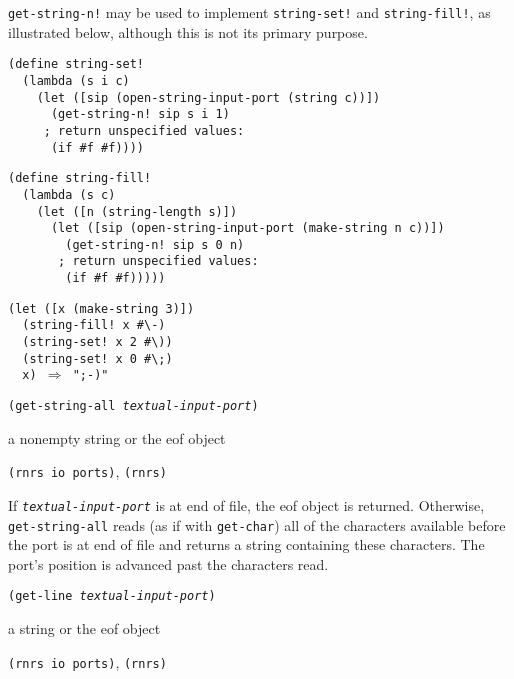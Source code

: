 \texttt{get-string-n!} may be used to implement \texttt{string-set!} and
\texttt{string-fill!}, as illustrated below, although this is not its
primary purpose.

\begin{alltt}
(define string-set!\label{io_backdoor_string_fill}
  (lambda (s i c)
    (let ([sip (open-string-input-port (string c))])
      (get-string-n! sip s i 1)
     ; return unspecified values:
      (if \#{}f \#{}f))))

(define string-fill!
  (lambda (s c)
    (let ([n (string-length s)])
      (let ([sip (open-string-input-port (make-string n c))])
        (get-string-n! sip s 0 n)
       ; return unspecified values:
        (if \#{}f \#{}f)))))

(let ([x (make-string 3)])
  (string-fill! x \#{}\textbackslash{}-)
  (string-set! x 2 \#{}\textbackslash{}))
  (string-set! x 0 \#{}\textbackslash{};)
  x) \(\Rightarrow\) ";-)"
\end{alltt}

\begin{description}

\label{io_s65}\item[procedure] \texttt{(get-string-all \textit{textual-input-port})}



\item[returns] a nonempty string or the eof object


\item[libraries] \texttt{(rnrs io ports)}, \texttt{(rnrs)}
\end{description}


If \texttt{\textit{textual-input-port}} is at end of file, the eof object is returned.
Otherwise, \texttt{get-string-all} reads (as if with \texttt{get-char})
all of the characters available before the port is at end of file and
returns a string containing these characters.
The port's position is advanced past the characters read.


\begin{description}

\label{io_s66}\item[procedure] \texttt{(get-line \textit{textual-input-port})}



\item[returns] a string or the eof object


\item[libraries] \texttt{(rnrs io ports)}, \texttt{(rnrs)}
\end{description}


